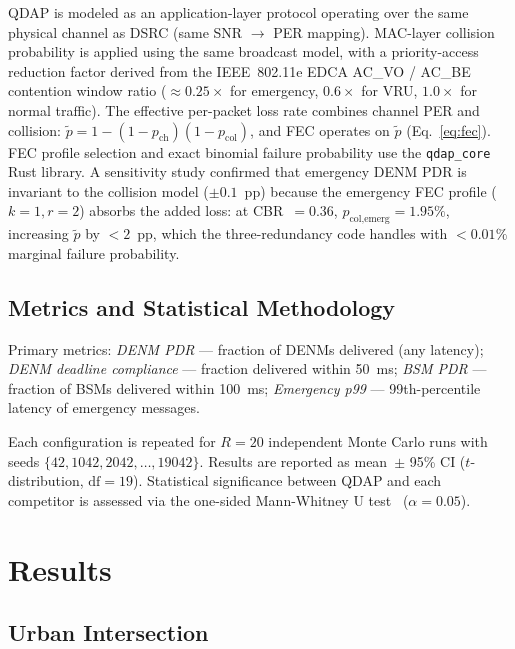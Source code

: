 \documentclass[journal]{IEEEtran}
\begin{document}
QDAP is modeled as an application-layer protocol operating over the same
physical channel as DSRC (same SNR $\to$ PER mapping).
MAC-layer collision probability is applied using the same broadcast model,
with a priority-access reduction factor derived from the IEEE~802.11e EDCA
AC\_VO / AC\_BE contention window ratio ($\approx\!0.25\times$ for emergency,
$0.6\times$ for VRU, $1.0\times$ for normal traffic).
The effective per-packet loss rate combines channel PER and collision:
$\tilde{p} = 1 - (1-p_{\text{ch}})(1-p_{\text{col}})$, and FEC operates
on $\tilde{p}$ (Eq.~\ref{eq:fec}).
FEC profile selection and exact binomial failure probability use the
\texttt{qdap\_core} Rust library.
A sensitivity study confirmed that emergency DENM PDR is invariant to the
collision model ($\pm 0.1$~pp) because the emergency FEC profile
($k{=}1, r{=}2$) absorbs the added loss: at CBR~$=\!0.36$,
$p_{\text{col,emerg}} = 1.95\%$, increasing $\tilde{p}$ by $<\!2$~pp,
which the three-redundancy code handles with $<\!0.01\%$ marginal failure
probability.

\subsection{Metrics and Statistical Methodology}

Primary metrics:
\textit{DENM PDR} — fraction of DENMs delivered (any latency);
\textit{DENM deadline compliance} — fraction delivered within \SI{50}{\milli\second};
\textit{BSM PDR} — fraction of BSMs delivered within \SI{100}{\milli\second};
\textit{Emergency p99} — 99th-percentile latency of emergency messages.

Each configuration is repeated for $R{=}20$ independent Monte Carlo runs
with seeds $\{42, 1042, 2042, \ldots, 19042\}$.
Results are reported as mean~$\pm$ 95\% CI ($t$-distribution, $\mathrm{df}=19$).
Statistical significance between QDAP and each competitor is assessed via
the one-sided Mann-Whitney U test~\cite{Mann1947} ($\alpha = 0.05$).


\section{Results}
\label{sec:results}


\subsection{Urban Intersection}
\end{document}
